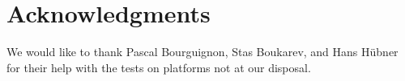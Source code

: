 \section{Acknowledgments} 

We would like to thank Pascal Bourguignon, Stas Boukarev, and Hans
Hübner for their help with the tests on platforms not at our disposal.
